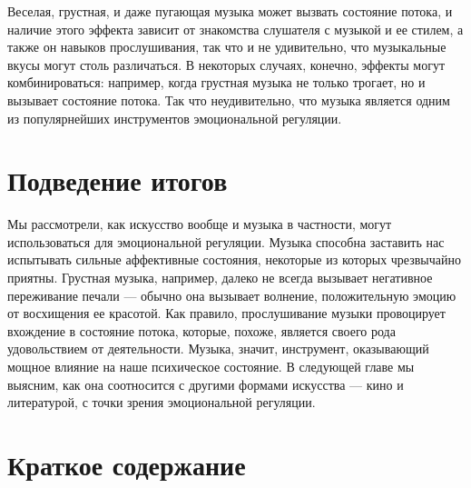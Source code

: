 \documentclass[11pt]{book}
\begin{document}
Веселая, грустная, и даже пугающая музыка может вызвать состояние потока, и наличие этого эффекта зависит от знакомства слушателя с музыкой и ее стилем, а также он навыков прослушивания, так что и не удивительно, что музыкальные вкусы могут столь различаться. В некоторых случаях, конечно, эффекты могут комбинироваться: например, когда грустная музыка не только трогает, но и вызывает состояние потока. Так что неудивительно, что музыка является одним из популярнейших инструментов эмоциональной регуляции.

\section{Подведение итогов}

Мы рассмотрели, как искусство вообще и музыка в частности, могут использоваться для эмоциональной регуляции. Музыка способна заставить нас испытывать сильные аффективные состояния, некоторые из которых чрезвычайно приятны. Грустная музыка, например, далеко не всегда вызывает негативное переживание печали --- обычно она вызывает волнение, положительную эмоцию от восхищения ее красотой. Как правило, прослушивание музыки провоцирует вхождение в состояние потока, которые, похоже, является своего рода удовольствием от деятельности. Музыка, значит, инструмент, оказывающий мощное влияние на наше психическое состояние. В следующей главе мы выясним, как она соотносится с другими формами искусства --- кино и литературой, с точки зрения эмоциональной регуляции.

\section{Краткое содержание}
\end{document}
